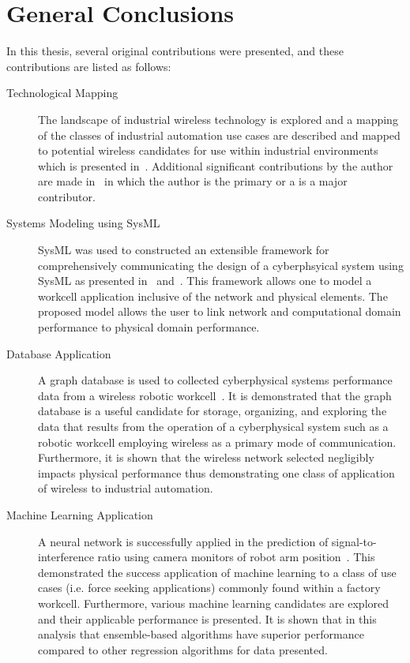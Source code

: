 
\chapter{General Conclusions}

In this thesis, several original contributions were presented, and these contributions are listed as follows:

\begin{description}
	\item[Technological Mapping] The landscape of industrial wireless technology is explored and a mapping of the classes of industrial automation use cases are described and mapped to potential wireless candidates for use within industrial environments which is presented in~\cite{CandellRW2017}.  Additional significant contributions by the author are made in~\cite{Candell2018.IWSGuide, Candell2017.SAS.IWSWorkshopReport, Montgomery2019} in which the author is the primary or a is a major contributor.
	
	\item[Systems Modeling using SysML] SysML was used to constructed an extensible framework for comprehensively communicating the design of a cyberphsyical system using SysML as presented in~\cite{SysML.Candell2018} and~\cite{Candell2018SysML.DATA}.  This framework allows one to model a workcell application inclusive of the network and physical elements.  The proposed model allows the user to link network and computational domain performance to physical domain performance.
	
	\item[Database Application] A graph database is used to collected cyberphysical systems performance data from a wireless robotic workcell~\cite{CandellISIT2020.Conf}.  It is demonstrated that the graph database is a useful candidate for storage, organizing, and exploring the data that results from the operation of a cyberphysical system such as a robotic workcell employing wireless as a primary mode of communication.  Furthermore, it is shown that the wireless network selected negligibly impacts physical performance thus demonstrating one class of application of wireless to industrial automation.
	
	\item[Machine Learning Application] A neural network is successfully applied in the prediction of signal-to-interference ratio using camera monitors of robot arm position~\cite{CandellISIE2019.Conf, CandellIJAMT2020.Jrml}.  This demonstrated the success application of machine learning to a class of use cases (i.e. force seeking applications) commonly found within a factory workcell.  Furthermore, various machine learning candidates are explored and their applicable performance is presented.  It is shown that in this analysis that ensemble-based algorithms have superior performance compared to other regression algorithms for data presented.  
\end{description}


